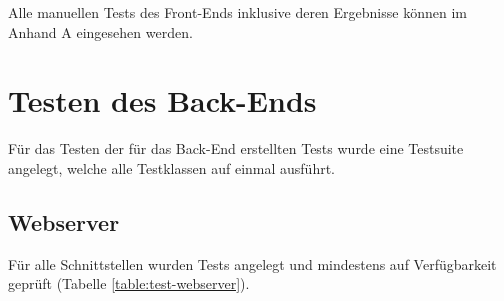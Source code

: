 Alle manuellen Tests des Front-Ends inklusive deren Ergebnisse können im Anhand A eingesehen werden.

\section{Testen des Back-Ends}
Für das Testen der für das Back-End erstellten Tests wurde eine Testsuite angelegt, welche alle Testklassen auf einmal ausführt.
\subsection{Webserver}
Für alle Schnittstellen wurden Tests angelegt und mindestens auf Verfügbarkeit geprüft (Tabelle \ref{table:test-webserver}).

\begin{table}[h]
	\centering
	\caption{Unittests für Webserver}
	\label{table:test-webserver}
\end{table}
